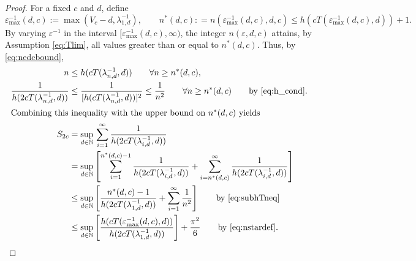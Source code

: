 \documentclass[sort&compress]{elsarticle}
\newcommand{\peter}[1]{\begingroup\color{violet}#1\endgroup}
\begin{document}
\begin{proof}
For a fixed $c$ and $d$, define
\begin{equation} \label{eq:nstardef}
	\varepsilon^{-1}_{\max}(d,c) := \max(V_c - d,\lambda_{1,d}^{-1}), \qquad n^*(d,c) : = n(\varepsilon^{-1}_{\max}(d,c),d,c) \le h(cT(\varepsilon^{-1}_{\max}(d,c),d)) +1.
\end{equation}
By varying $\varepsilon^{-1}$ in the interval $[\varepsilon^{-1}_{\max}(d,c),\infty)$,  the integer $n(\varepsilon,d,c)$ attains, \peter{by Assumption \eqref{eq:Tlim},} all values greater than or equal to $n^*(d,c)$.  Thus, by \eqref{eq:nedcbound},
\begin{align}
		n &\le h(cT(\lambda^{-1}_{n,d},d)) \qquad  \forall n \ge n^*(d,c), \label{eq:subhTneq}\\
		\nonumber
		\frac{1}{h(2 cT(\lambda^{-1}_{n,d},d)) } & \le \frac{1}{[h(cT(\lambda^{-1}_{n,d},d))]^{2}}  \le \frac 1{n^2}   \qquad  \forall n \ge n^*(d,c) \qquad \text{by \eqref{eq:h_cond}}. \\
		\intertext{Combining this inequality with the upper bound on $n^*(d,c)$ yields}
		\nonumber
		S_{2c} & =\sup_{d\in\mathbb{N}}  \, \sum_{i=1}^\infty \frac1{h(2cT(\lambda_{i,d}^{-1},d))} \\
		\nonumber
		&  = \sup_{d\in\mathbb{N}} \left [
		\sum_{i=1}^{n^*(d,c)-1} \frac1{h(2cT(\lambda_{i,d}^{-1},d))}
		+ \sum_{i=n^*(d,c)}^\infty \frac1{h(2cT(\lambda_{i,d}^{-1},d))}
		\right]\\
		 \nonumber
		 & \le \sup_{d\in\mathbb{N}} \left [
\frac{n^*(d,c)-1}{h(2cT(\lambda_{1,d}^{-1},d))}
+ \sum_{i=1}^\infty \frac1{n^2}
\right]
 \qquad \text{by \eqref{eq:subhTneq}}\\
 \label{eq:lastone}
		 & \le \sup_{d\in\mathbb{N}} \left [
		 \frac{ h(cT(\varepsilon^{-1}_{\max}(d,c),d))}{h(2cT(\lambda_{1,d}^{-1},d))}
		\right] + \frac{\pi^2}{6}
		\qquad \text{by \eqref{eq:nstardef}.}
\end{align}


\end{proof}
\end{document}
